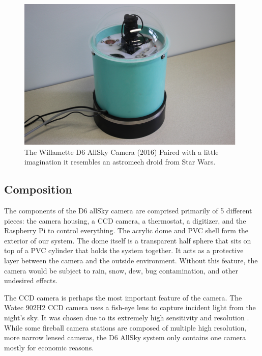 \begin{figure}[ht!]
  \centering
  \includegraphics[scale=0.7]{images/allsky_camera.png}
  \caption{The Willamette D6 AllSky Camera (2016) Paired with a little imagination it resembles an astromech droid from Star Wars.}
  \label{droid}
\end{figure}

\subsection{Composition}

The components of the D6 allSky camera are comprised primarily of 5 different pieces: the camera housing, a CCD camera, a thermostat, a digitizer, and the Raspberry Pi to control everything.
The acrylic dome and PVC shell form the exterior of our system. 
The dome itself is a transparent half sphere that sits on top of a PVC cylinder that holds the system together.
It acts as a protective layer between the camera and the outside environment.  
Without this feature, the camera would be subject to rain, snow, dew, bug contamination, and other undesired effects.

The CCD camera is perhaps the most important feature of the camera.  
The Watec $902$H$2$ CCD camera uses a fish-eye lens to capture incident light from the night's sky.
It was chosen due to its extremely high sensitivity and resolution \cite{mcswain_using_2016}.
While some fireball camera stations are composed of multiple high resolution, more narrow lensed cameras, the D6 AllSky system only contains one camera mostly for economic reasons.

